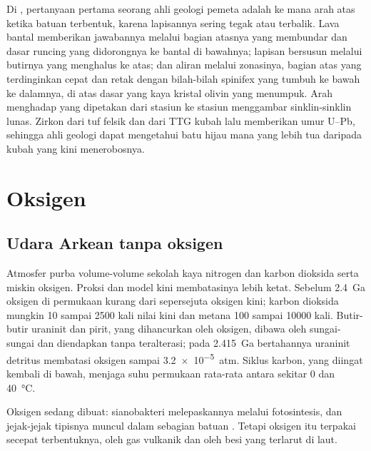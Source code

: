\begin{inthefield}
Di , pertanyaan pertama seorang ahli geologi pemeta adalah ke mana arah atas ketika
batuan terbentuk, karena lapisannya sering tegak atau terbalik. Lava bantal memberikan jawabannya
melalui bagian atasnya yang membundar dan dasar runcing yang didorongnya ke bantal di bawahnya; lapisan bersusun melalui
butirnya yang menghalus ke atas; dan aliran  melalui zonasinya, bagian atas yang terdinginkan cepat dan retak dengan
bilah-bilah spinifex yang tumbuh ke bawah ke dalamnya, di atas dasar yang kaya kristal olivin yang menumpuk. Arah
menghadap yang dipetakan dari stasiun ke stasiun menggambar sinklin-sinklin lunas. Zirkon dari tuf felsik
dan dari TTG kubah lalu memberikan umur U--Pb, sehingga ahli geologi dapat mengetahui batu hijau mana
yang lebih tua daripada kubah yang kini menerobosnya.
\end{inthefield}

\section{Oksigen}\label{sec:b2:precambrian-earth:oxygen}

\subsection*{Udara Arkean tanpa oksigen}

Atmosfer purba volume-volume sekolah kaya nitrogen dan karbon dioksida serta
miskin oksigen. Proksi dan model kini membatasinya lebih ketat. Sebelum \qty{2.4}{Ga} oksigen
di permukaan kurang dari sepersejuta oksigen kini; karbon dioksida mungkin 10 sampai 2500
kali nilai kini dan metana 100 sampai \num{10000} kali. Butir-butir uraninit dan pirit, yang
dihancurkan oleh oksigen, dibawa oleh sungai-sungai  dan diendapkan tanpa teralterasi; pada \qty{2.415}{Ga}
bertahannya uraninit detritus membatasi oksigen sampai \qty{3.2e-5}{atm}. Siklus karbon, yang diingat kembali
di bawah, menjaga suhu permukaan rata-rata antara sekitar 0 dan \qty{40}{\celsius}.

Oksigen sedang dibuat: sianobakteri melepaskannya melalui fotosintesis, dan jejak-jejak tipisnya muncul dalam
sebagian batuan . Tetapi oksigen itu terpakai secepat terbentuknya, oleh gas vulkanik dan oleh besi
yang terlarut di laut.

